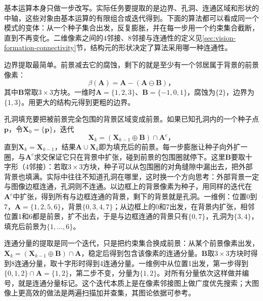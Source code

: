 基本运算本身只做一步改写。实际任务要提取的是边界、孔洞、连通区域和形状的中轴，这些对象由基本运算的有限组合或迭代得到。下面的算法都可以看成同一个模式的变体：从一个种子集合出发，反复膨胀，并在每一步用一个约束集合截断，直到不再变化。二维像素之间的4邻接、8邻接与连通性的定义见\ref{sec:vision-formation-connectivity}节，结构元的形状决定了算法采用哪一种连通性。

边界提取最简单。前景减去它的腐蚀，剩下的就是至少有一个邻居属于背景的前景像素：
\begin{equation}
  \beta(\bm{A})=\bm{A}-(\bm{A}\ominus\bm{B})\text{，}
  \label{eq:vision-transforms-boundary}
\end{equation}
其中$\bm{B}$常取$3\times3$方块。一维时$\bm{A}=\{1,2,3\}$、$\bm{B}=\{-1,0,1\}$，腐蚀为$\{2\}$，边界为$\{1,3\}$。用更大的结构元得到更粗的边界。

孔洞填充要把被前景完全包围的背景区域变成前景。如果已知孔洞内的一个种子点$\bm{p}$，令$\bm{X}_0=\{\bm{p}\}$，迭代
\begin{equation}
  \bm{X}_k=(\bm{X}_{k-1}\oplus\bm{B})\cap\bm{A}^{c}\text{，}
  \label{eq:vision-transforms-hole-filling}
\end{equation}
直到$\bm{X}_k=\bm{X}_{k-1}$，结果$\bm{A}\cup\bm{X}_k$即为填充后的前景。每一步膨胀让种子向外扩一圈，与$\bm{A}^{c}$求交保证它只在背景中扩张，碰到前景的包围圈就停下。这里$\bm{B}$要取十字形（4邻接）：若取$3\times3$方块，种子可以从包围圈的对角缝隙中漏出去，把外部背景也填满。实际中往往不知道孔洞在哪里，这时换一个方向思考：外部背景一定与图像边框连通，孔洞则不连通。以边框上的背景像素为种子，用同样的迭代在$\bm{A}^{c}$中扩张，得到所有与边框连通的背景，剩下的背景就是孔洞。一维例：位置0到7，$\bm{A}=\{1,2,5,6\}$，背景$\{0,3,4,7\}$；从边框上的0和7出发，在背景内扩张，相邻位置1和6都是前景，扩不出去，于是与边框连通的背景只有$\{0,7\}$，孔洞为$\{3,4\}$，填充后前景为$\{1,\ldots,6\}$。

连通分量的提取是同一个迭代，只是把约束集合换成前景：从某个前景像素出发，$\bm{X}_k=(\bm{X}_{k-1}\oplus\bm{B})\cap\bm{A}$，稳定后得到包含该像素的连通分量。$\bm{B}$取$3\times3$方块时得到8连通分量，取十字形时得到4连通分量。一维例中从位置1出发，第一步得到$\{0,1,2\}\cap\bm{A}=\{1,2\}$，第二步不变，分量为$\{1,2\}$。对所有分量依次这样做并编号，就是连通分量标记。这个迭代本质上是在像素邻接图上做广度优先搜索；大图像上更高效的做法是两遍扫描加并查集，其图论依据可参考。

